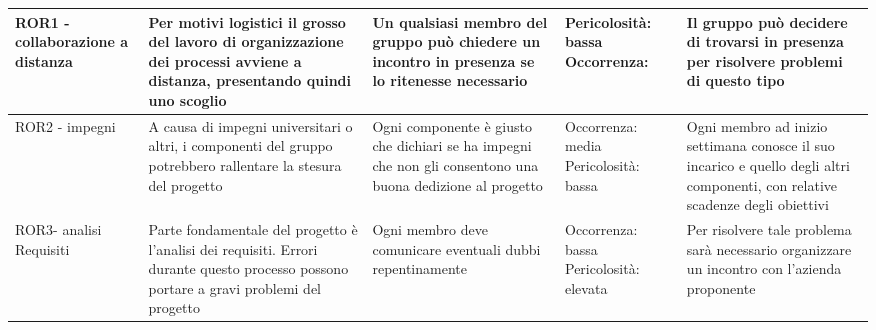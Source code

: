 {\begin{longtable}{C{.13\freewidth} C{.18\freewidth} C{.22\freewidth} C{.18\freewidth} C{.282379\freewidth}}
      ROR1 - collaborazione a distanza & Per motivi logistici il grosso del lavoro di organizzazione dei processi avviene a distanza, presentando quindi uno scoglio & Un qualsiasi membro del gruppo può chiedere un incontro in presenza se lo ritenesse necessario
      & Pericolosità: bassa Occorrenza:  & Il gruppo può decidere di trovarsi in presenza per risolvere problemi di questo tipo \\
      \bottomrule
      ROR2 - impegni & A causa di impegni universitari o altri, i componenti del gruppo potrebbero rallentare la stesura del progetto & Ogni componente è giusto che dichiari se ha  impegni che non gli consentono una buona dedizione al progetto
      & Occorrenza: media Pericolosità: bassa & Ogni membro ad inizio settimana conosce il suo incarico e quello degli altri componenti, con relative scadenze degli obiettivi \\
      \bottomrule
      ROR3- analisi Requisiti & Parte fondamentale del progetto è l’analisi dei requisiti. Errori durante questo processo possono portare a gravi problemi del progetto & Ogni membro deve comunicare eventuali dubbi repentinamente 
      & Occorrenza: bassa Pericolosità: elevata & Per risolvere tale problema sarà necessario organizzare un incontro con l’azienda proponente \\
      \bottomrule
      \end{longtable}
   }

